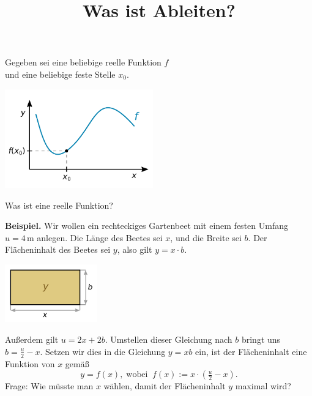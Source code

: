 \documentclass[9pt]{beamer}
\title{Was ist Ableiten?}
\date{}
\newcommand{\unit}[1]{\mathrm{#1}}
\newcommand{\strong}[1]{\textsf{\textbf{#1}}}
\begin{document}
\begin{frame}
\maketitle
\end{frame}

\begin{frame}[t]
\vspace{3em}
Gegeben sei eine beliebige reelle Funktion $f$\\
und eine beliebige feste Stelle $x_0$.\pause

\begin{center}
\includegraphics[width=64mm]{img/Funktion.pdf}
\end{center}
\end{frame}

\begin{frame}
Was ist eine reelle Funktion?\pause

\vspace{0.6em}
\strong{Beispiel.} Wir wollen ein
rechteckiges Gartenbeet mit einem festen Umfang $u=4\,\unit{m}$
anlegen. Die Länge des Beetes sei $x$, und die Breite sei $b$.
Der Flächeninhalt des Beetes sei $y$, also gilt $y=x\cdot b$.\pause

\begin{center}
\includegraphics[width=40mm]{img/Beet.pdf}
\end{center}
\end{frame}

\begin{frame}
Außerdem gilt $u=2x+2b$. Umstellen dieser Gleichung nach $b$ bringt
uns $b=\tfrac{u}{2}-x$.\pause{}
Setzen wir dies in die Gleichung $y=xb$ ein,
ist der Flächeninhalt eine Funktion von $x$ gemäß
\[y = f(x),\;\text{wobei}\;\; f(x) := x\cdot (\tfrac{u}{2}-x).\]
\pause
Frage: Wie müsste man $x$ wählen, damit der Flächeninhalt $y$
maximal wird? 
\end{frame}
\end{document}
